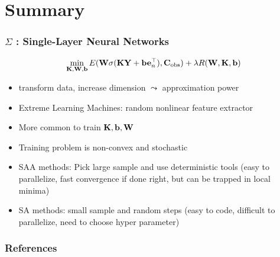 \documentclass[12pt,fleqn,handout]{beamer}
\begin{document}
\section{Summary}
\begin{frame}
	\frametitle{$\Sigma$ : Single-Layer Neural Networks }
	$$ \min_{{\bf K},{\bf W},{\bf b}} E({\bf W}\sigma({\bf K} {\bf Y} + {\bf b}{\bf e}_n^\top), {\bf C}_{\rm obs}) + \lambda R({\bf W},{\bf K},{\bf b})$$
	
	\begin{itemize}
		\item transform data, increase dimension $\leadsto$ approximation power
		\item Extreme Learning Machines: random nonlinear feature extractor
		\item More common to train ${\bf K}, {\bf b}, {\bf W}$
		\item Training problem is non-convex and stochastic
		\item SAA methods: Pick large sample and use deterministic tools (easy to parallelize, fast convergence if done right, but can be trapped in local minima)
		\item SA methods: small sample and random steps (easy to code, difficult to parallelize, need to choose hyper parameter)
	\end{itemize}
\end{frame}



\begin{frame}[allowframebreaks]
	\frametitle{References}



\end{frame}
\end{document}
